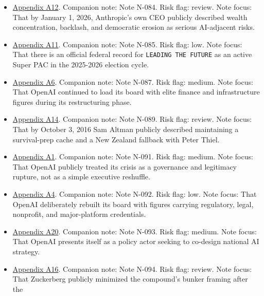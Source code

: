 \documentclass[
  american,
  11pt,
  letterpaper,
]{article}
\begin{document}
\begin{itemize}
  lobbying by early 2026.
\item
  \hyperref[ch-08-appendix-a12-the-adolescence-of-technology]{Appendix
  A12}. Companion note: Note N-084. Risk flag: review. Note focus: That
  by January 1, 2026, Anthropic's own CEO publicly described wealth
  concentration, backlash, and democratic erosion as serious AI-adjacent
  risks.
\item
  \hyperref[ch-08-appendix-a11-leading-the-future-committee-overview]{Appendix
  A11}. Companion note: Note N-085. Risk flag: low. Note focus: That
  there is an official federal record for \texttt{LEADING\ THE\ FUTURE}
  as an active Super PAC in the 2025-2026 election cycle.
\item
  \hyperref[ch-08-appendix-a6-openai-appoints-one-of-wall-street-s-most-powerful-dealmakers-to-its-board]{Appendix
  A6}. Companion note: Note N-087. Risk flag: medium. Note focus: That
  OpenAI continued to load its board with elite finance and
  infrastructure figures during its restructuring phase.
\item
  \hyperref[ch-08-appendix-a14-sam-altman-s-manifest-destiny]{Appendix
  A14}. Companion note: Note N-089. Risk flag: review. Note focus: That
  by October 3, 2016 Sam Altman publicly described maintaining a
  survival-prep cache and a New Zealand fallback with Peter Thiel.
\item
  \hyperref[ch-08-appendix-a1-openai-announces-leadership-transition]{Appendix
  A1}. Companion note: Note N-091. Risk flag: medium. Note focus: That
  OpenAI publicly treated its crisis as a governance and legitimacy
  rupture, not as a simple executive reshuffle.
\item
  \hyperref[ch-08-appendix-a4-openai-announces-new-members-to-board-of-directors]{Appendix
  A4}. Companion note: Note N-092. Risk flag: low. Note focus: That
  OpenAI deliberately rebuilt its board with figures carrying
  regulatory, legal, nonprofit, and major-platform credentials.
\item
  \hyperref[ch-08-appendix-a20-openais-proposals-for-the-us-ai-action-plan]{Appendix
  A20}. Companion note: Note N-093. Risk flag: medium. Note focus: That
  OpenAI presents itself as a policy actor seeking to co-design national
  AI strategy.
\item
  \hyperref[ch-08-appendix-a16-mark-zuckerberg-downplays-his-5-000-square-foot-underground-bunker-in-hawaii-just-a-little-shelter]{Appendix
  A16}. Companion note: Note N-094. Risk flag: review. Note focus: That
  Zuckerberg publicly minimized the compound's bunker framing after the

\end{itemize}
\end{document}
